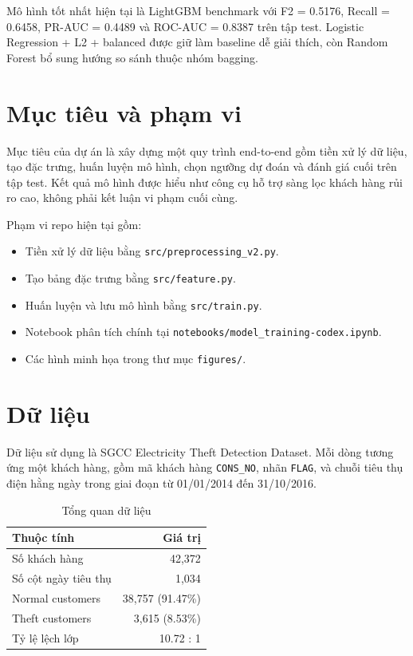\documentclass[12pt,a4paper]{article}
\begin{document}
\begin{tcolorbox}[colback=boxblue,colframe=boxborder,title=Kết quả chính,arc=2mm]
Mô hình tốt nhất hiện tại là LightGBM benchmark với F2 = 0.5176, Recall = 0.6458, PR-AUC = 0.4489 và ROC-AUC = 0.8387 trên tập test. Logistic Regression + L2 + balanced được giữ làm baseline dễ giải thích, còn Random Forest bổ sung hướng so sánh thuộc nhóm bagging.
\end{tcolorbox}

\section{Mục tiêu và phạm vi}

Mục tiêu của dự án là xây dựng một quy trình end-to-end gồm tiền xử lý dữ liệu, tạo đặc trưng, huấn luyện mô hình, chọn ngưỡng dự đoán và đánh giá cuối trên tập test. Kết quả mô hình được hiểu như công cụ hỗ trợ sàng lọc khách hàng rủi ro cao, không phải kết luận vi phạm cuối cùng.

Phạm vi repo hiện tại gồm:
\begin{itemize}
    \item Tiền xử lý dữ liệu bằng \texttt{src/preprocessing\_v2.py}.
    \item Tạo bảng đặc trưng bằng \texttt{src/feature.py}.
    \item Huấn luyện và lưu mô hình bằng \texttt{src/train.py}.
    \item Notebook phân tích chính tại \texttt{notebooks/model\_training-codex.ipynb}.
    \item Các hình minh họa trong thư mục \texttt{figures/}.
\end{itemize}

\section{Dữ liệu}

Dữ liệu sử dụng là SGCC Electricity Theft Detection Dataset. Mỗi dòng tương ứng một khách hàng, gồm mã khách hàng \texttt{CONS\_NO}, nhãn \texttt{FLAG}, và chuỗi tiêu thụ điện hằng ngày trong giai đoạn từ 01/01/2014 đến 31/10/2016.

\begin{table}[h]
\centering
\caption{Tổng quan dữ liệu}
\begin{tabular}{lr}
\toprule
Thuộc tính & Giá trị \\
\midrule
Số khách hàng & 42,372 \\
Số cột ngày tiêu thụ & 1,034 \\
Normal customers & 38,757 (91.47\%) \\
Theft customers & 3,615 (8.53\%) \\
Tỷ lệ lệch lớp & 10.72 : 1 \\
\bottomrule
\end{tabular}
\end{table}
\end{document}
